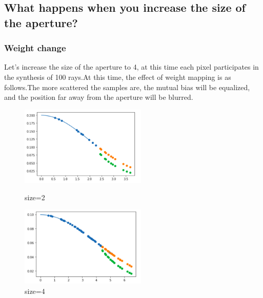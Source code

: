 \documentclass[letterpaper,12pt]{article}
\begin{document}
\subsection{What happens when you increase the size of the aperture?}
\subsubsection{Weight change}
Let's increase the size of the aperture to 4, at this time each pixel participates in the synthesis of 100 rays.At this time, the effect of weight mapping is as follows.The more scattered the samples are, the mutual bias will be equalized, and the position far away from the aperture will be blurred.
	\begin{figure}[htbp]
	\centering
	\begin{minipage}[t]{0.48\textwidth}
		\centering
		\includegraphics[width=6cm]{Image/weight.png}
		\caption{size=2}
	\end{minipage}
	\begin{minipage}[t]{0.48\textwidth}
		\centering
		\includegraphics[width=6cm]{Image/size4w.png}
		\caption{size=4}
	\end{minipage}
\end{figure}
\end{document}
